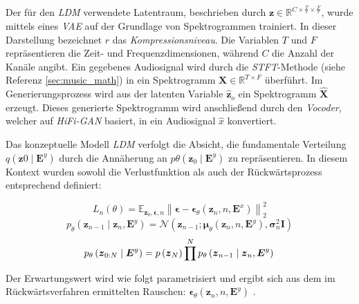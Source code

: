 \documentclass[
  a4paper,  %
  twoside,  %
  bibliography=totoc,
  headsepline,
  cleardoublepage=empty,
  parskip=half,
  draft=false
]{scrbook}
\begin{document}
Der für den \emph{LDM} verwendete Latentraum, beschrieben durch $\boldsymbol{z} \in \mathbb{R}^{C \times \frac{T}{r} \times \frac{F}{r}}$, wurde mittels eines \emph{VAE} auf der Grundlage von Spektrogrammen trainiert. In dieser Darstellung bezeichnet $r$ das \emph{Kompressionsniveau}. Die Variablen $T$ und $F$ repräsentieren die Zeit- und Frequenzdimensionen, während $C$ die Anzahl der Kanäle angibt. Ein gegebenes Audiosignal wird durch die \emph{STFT}-Methode (siehe Referenz \ref{sec:music_math}) in ein Spektrogramm $\boldsymbol{X} \in \mathbb{R}^{T \times F}$ überführt. Im Generierungsprozess wird aus der latenten Variable $\hat{\boldsymbol{z}}_o$ ein Spektrogramm $\hat{\boldsymbol{X}}$ erzeugt. Dieses generierte Spektrogramm wird anschließend durch den \emph{Vocoder}, welcher auf \emph{HiFi-GAN} \cite{kong_hifi-gan_2020} basiert, in ein Audiosignal $\hat{x}$ konvertiert. \cite{liu_audioldm_2023}

Das konzeptuelle Modell \emph{LDM} verfolgt die Absicht, die fundamentale Verteilung $q\left(\boldsymbol{z}0 \mid \boldsymbol{E}^y\right)$ durch die Annäherung an $p\theta\left(\boldsymbol{z}_0 \mid \boldsymbol{E}^y\right)$ zu repräsentieren. In diesem Kontext wurden sowohl die Verlustfunktion als auch der Rückwärtsprozess entsprechend definiert: \cite{liu_audioldm_2023}

\begin{equation}
    L_n(\theta)=\mathbb{E}_{\boldsymbol{z}_0, \boldsymbol{\epsilon}, n}\left\|\boldsymbol{\epsilon}-\boldsymbol{\epsilon}_\theta\left(\boldsymbol{z}_n, n, \boldsymbol{E}^x\right)\right\|_2^2
\end{equation}
\begin{equation}
    p_\theta\left(\boldsymbol{z}_{n-1} \mid \boldsymbol{z}_n, \boldsymbol{E}^y\right)=\mathcal{N}\left(\boldsymbol{z}_{n-1} ; \boldsymbol{\mu}_\theta\left(\boldsymbol{z}_n, n, \boldsymbol{E}^y\right), \boldsymbol{\sigma}_n^2 \boldsymbol{I}\right)
\end{equation}
\begin{equation}
    p_\theta\left(\boldsymbol{z}_{0: N} \mid \boldsymbol{E}^y\right)=p\left(\boldsymbol{z}_N\right) \prod^N p_\theta\left(\boldsymbol{z}_{n-1} \mid \boldsymbol{z}_n, \boldsymbol{E}^y\right) \\
\end{equation}

Der Erwartungswert wird wie folgt parametrisiert und ergibt sich aus dem im Rückwärtsverfahren ermittelten Rauschen: $\boldsymbol{\epsilon}_\theta\left(\boldsymbol{z}_n, n, \boldsymbol{E}^y\right)$ \cite{liu_audioldm_2023}.
\end{document}
